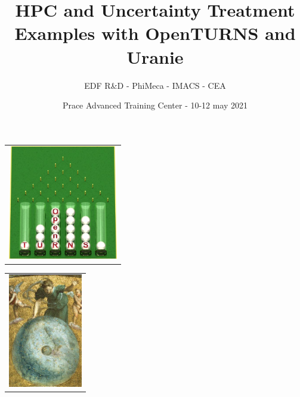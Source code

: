 \documentclass[11pt, french, A4wide]{article}
\title{HPC and Uncertainty Treatment \\
 Examples with OpenTURNS and Uranie}
\author{EDF R\&D - PhiMeca - IMACS - CEA}
\date{Prace Advanced Training Center - 10-12 may 2021}
\theoremstyle{remark}
\theoremstyle{definition}
\begin{document}
  \maketitle


\vspace*{2cm}


\begin{minipage}{6cm}
  \begin{center}
    \begin{tabular}{c}
\includegraphics[height=5cm]{logoOpenTURNS.jpg}
    \end{tabular}
  \end{center}
\end{minipage}
\hfill
\begin{minipage}{6cm}
  \begin{center}
    \begin{tabular}{c}
\includegraphics[height=5cm]{uranie_splash.png}
    \end{tabular}
  \end{center}
\end{minipage}

\vspace*{2cm}
\end{document}
